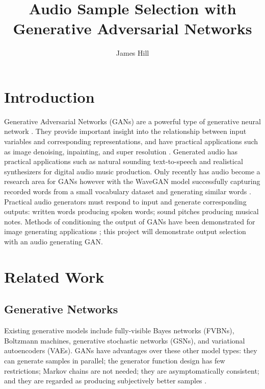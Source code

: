 \documentclass[a4paper, dvipsnames, titlepage]{article}
\title{Audio Sample Selection with Generative Adversarial Networks}
\author{James Hill}
\date{}
\begin{document}
\maketitle
\tableofcontents

\newpage

\section{Introduction}

Generative Adversarial Networks (GANs) are a powerful type of generative neural network \citep{2014arXiv1406.2661G}.
They provide important insight into the relationship between input variables and corresponding representations, and have practical applications such as image denoising, inpainting, and super resolution \citep{openai_blog_2017}.
\newline
\newline
Generated audio has practical applications such as natural sounding text-to-speech and realistical synthesizers for digital audio music production.
Only recently has audio become a research area for GANs however with the WaveGAN model successfully capturing recorded words from a small vocabulary dataset and generating similar words \citep{2018arXiv180204208D}.
\newline
\newline
Practical audio generators must respond to input and generate corresponding outputs: written words producing spoken words; sound pitches producing musical notes.
Methods of conditioning the output of GANs have been demonstrated for image generating applications \citep{2014arXiv1411.1784M}; this project will demonstrate output selection with an audio generating GAN.

\newpage

\section{Related Work}

\subsection{Generative Networks}

Existing generative models include fully-visible Bayes networks (FVBNs), Boltzmann machines, generative stochastic networks (GSNs), and variational autoencoders (VAEs).
GANs have advantages over these other model types: they can generate samples in parallel; the generator function design has few restrictions; Markov chains are not needed; they are asymptomatically consistent; and they are regarded as producing subjectively better samples \citep{2017arXiv170100160G}.
\end{document}
